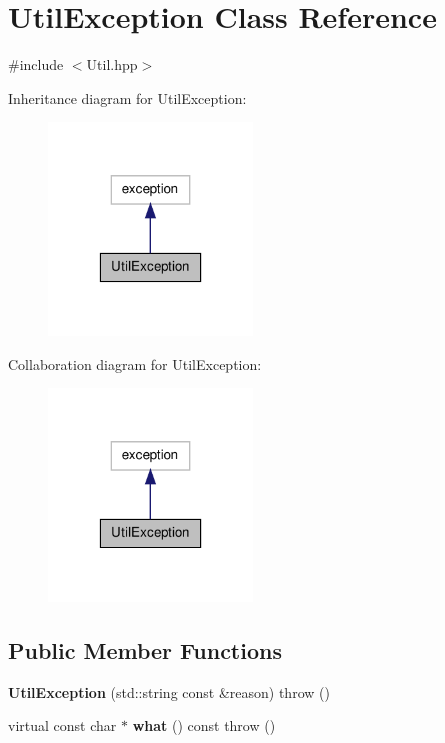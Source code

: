 \hypertarget{class_util_exception}{\section{Util\-Exception Class Reference}
\label{class_util_exception}
}


{\ttfamily \#include $<$Util.\-hpp$>$}



Inheritance diagram for Util\-Exception\-:\nopagebreak
\begin{figure}[H]
\begin{center}
\leavevmode
\includegraphics[width=154pt]{class_util_exception__inherit__graph}
\end{center}
\end{figure}


Collaboration diagram for Util\-Exception\-:\nopagebreak
\begin{figure}[H]
\begin{center}
\leavevmode
\includegraphics[width=154pt]{class_util_exception__coll__graph}
\end{center}
\end{figure}
\subsection*{Public Member Functions}
\begin{DoxyCompactItemize}
\item 
\hypertarget{class_util_exception_a79e310454f8d14a0a2a5a11caa4aef1e}{{\bfseries Util\-Exception} (std\-::string const \&reason)  throw ()}\label{class_util_exception_a79e310454f8d14a0a2a5a11caa4aef1e}

\item 
\hypertarget{class_util_exception_a619da93efa70bf33b1a50a830f5e63b9}{virtual const char $\ast$ {\bfseries what} () const   throw ()}\label{class_util_exception_a619da93efa70bf33b1a50a830f5e63b9}

\end{DoxyCompactItemize}


